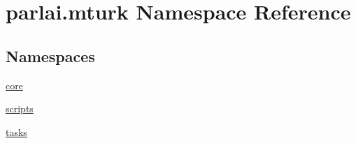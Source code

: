 \hypertarget{namespaceparlai_1_1mturk}{}\section{parlai.\+mturk Namespace Reference}
\label{namespaceparlai_1_1mturk}
\subsection*{Namespaces}
\begin{DoxyCompactItemize}
\item 
 \hyperlink{namespaceparlai_1_1mturk_1_1core}{core}
\item 
 \hyperlink{namespaceparlai_1_1mturk_1_1scripts}{scripts}
\item 
 \hyperlink{namespaceparlai_1_1mturk_1_1tasks}{tasks}
\end{DoxyCompactItemize}
